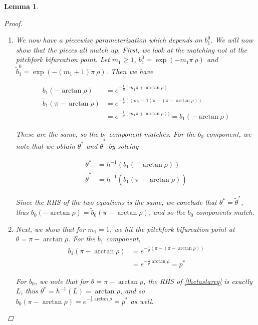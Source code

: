 \documentclass[12pt]{article}
\newtheorem{lemma}{Lemma}
\begin{document}
\begin{lemma}
\begin{proof}
\begin{enumerate}
\begin{enumerate}
		\item We now have a piecewise parameterization which depends on $b_1^0$. We will now show that the pieces all match up. First, we look at the matching not at the pitchfork bifurcation point. Let $m_1 \geq 1$, $b_1^0 = \exp(-m_1 \pi \ \rho )$ and $\tilde{b}_1^0 = \exp(-(m_1+1) \pi \ \rho )$. Then we have

		\begin{align*}
		b_1(-\arctan \rho) &= e^{ -\frac{1}{\rho}(m_1 \pi + \arctan \rho) } \\
		\tilde{b}_1(\pi - \arctan \rho) 
		&= e^{ -\frac{1}{\rho}((m_1+1) \pi - (\pi - \arctan \rho)) } \\
		&= e^{ -\frac{1}{\rho}(m_1 \pi + \arctan \rho)) } = b_1(-\arctan \rho)
		\end{align*}

		These are the same, so the $b_1$ component matches. For the $b_0$ component, we note that we obtain $\theta^*$ and $\tilde{\theta}^*$ by solving

		\begin{align*}
		\theta^* &= h^{-1} (b_1(-\arctan \rho)) \\
		\tilde{\theta}^* &= h^{-1} (\tilde{b}_1(\pi - \arctan \rho)) 
		\end{align*}

		Since the RHS of the two equations is the same, we conclude that $\theta^* = \tilde{\theta}^*$, thus $b_0(-\arctan \rho) = \tilde{b}_0(\pi - \arctan \rho)$, and so the $b_0$ components match.

		\item Next, we show that for $m_1 = 1$, we hit the pitchfork bifurcation point at $\theta = \pi - \arctan \rho$. For the $b_1$ component, 
		\begin{align*}
		b_1(\pi -\arctan \rho) &= e^{ -\frac{1}{\rho}(\pi - (\pi - \arctan \rho)) } \\
		&= e^{ -\frac{1}{\rho} \arctan \rho } = p^*
		\end{align*}

		For $b_0$, we note that for $\theta = \pi -\arctan \rho$, the RHS of \eqref{thetastareq} is exactly $L$, thus $\theta^* = h^{-1}(L) = \arctan \rho$, and so $b_0(\pi -\arctan \rho) = e^{ -\frac{1}{\rho} \arctan \rho } = p^*$ as well.


\end{enumerate}
\end{enumerate}
\end{proof}
\end{lemma}
\end{document}
